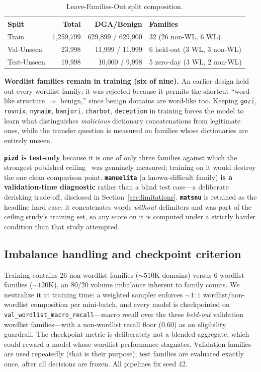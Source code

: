 \documentclass[conference]{IEEEtran}
\begin{document}
\begin{table}[t]
\centering
\caption{Leave-Families-Out split composition.}
\label{tab:split}
\footnotesize
\setlength{\tabcolsep}{4pt}
\begin{tabular}{@{}lrrp{2.2cm}@{}}
\toprule
Split & Total & DGA/Benign & Families \\
\midrule
Train & 1{,}259{,}799 & 629{,}899 / 629{,}900 & 32 (26 non-WL, 6 WL) \\
Val-Unseen & 23{,}998 & 11{,}999 / 11{,}999 & 6 held-out (3 WL, 3 non-WL) \\
Test-Unseen & 19{,}998 & 10{,}000 / 9{,}998 & 5 zero-day (3 WL, 2 non-WL) \\
\bottomrule
\end{tabular}
\end{table}

\textbf{Wordlist families remain in training (six of nine).} An earlier design held out every wordlist family; it was rejected because it permits the shortcut ``word-like structure $\Rightarrow$ benign,'' since benign domains are word-like too. Keeping \texttt{gozi}, \texttt{rovnix}, \texttt{nymaim}, \texttt{banjori}, \texttt{charbot}, \texttt{deception} in training forces the model to learn what distinguishes \emph{malicious} dictionary concatenations from legitimate ones, while the transfer question is measured on families whose dictionaries are entirely unseen.

\textbf{\texttt{pizd} is test-only} because it is one of only three families against which the strongest published ceiling~\cite{leyva2026} was genuinely measured; training on it would destroy the one clean comparison point. \textbf{\texttt{manuelita}} (a known-difficult family) \textbf{is a validation-time diagnostic} rather than a blind test case---a deliberate derisking trade-off, disclosed in Section~\ref{sec:limitations}. \textbf{\texttt{matsnu}} is retained as the headline hard case: it concatenates words \emph{without} delimiters and was part of the ceiling study's training set, so any score on it is computed under a strictly harder condition than that study attempted.

\subsection{Imbalance handling and checkpoint criterion}
Training contains 26 non-wordlist families (${\sim}510$K domains) versus 6 wordlist families (${\sim}120$K), an 80/20 volume imbalance inherent to family counts. We neutralize it at training time: a weighted sampler enforces ${\sim}1{:}1$ wordlist/non-wordlist composition per mini-batch, and every model is checkpointed on \texttt{val\_wordlist\_macro\_recall}---macro recall over the three \emph{held-out} validation wordlist families---with a non-wordlist recall floor (0.60) as an eligibility guardrail. The checkpoint metric is deliberately not a blended aggregate, which could reward a model whose wordlist performance stagnates. Validation families are used repeatedly (that is their purpose); test families are evaluated exactly once, after all decisions are frozen. All pipelines fix seed 42.
\end{document}
